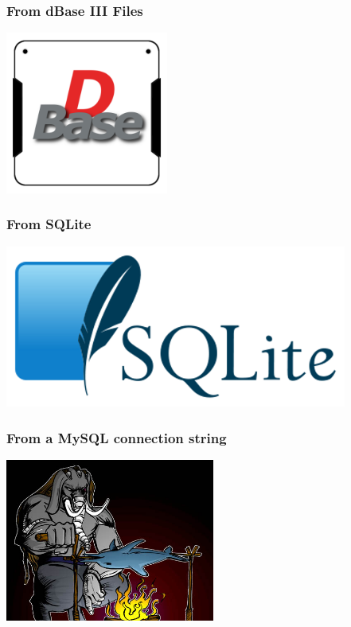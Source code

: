 \documentclass{beamer}
\begin{document}
\begin{frame}
  \frametitle{From dBase III Files}


  \begin{center}
    \includegraphics[height=2.1in]{dBase.png}
  \end{center}
\end{frame}

\begin{frame}
  \frametitle{From SQLite}


  \begin{center}
    \includegraphics[height=2.1in]{SQLite.png}
  \end{center}
\end{frame}

\begin{frame}
  \frametitle{From a MySQL connection string}


  \begin{center}
    \includegraphics[height=2.1in]{postgresql_versus_mysql.jpg}
  \end{center}
\end{frame}
\end{document}
